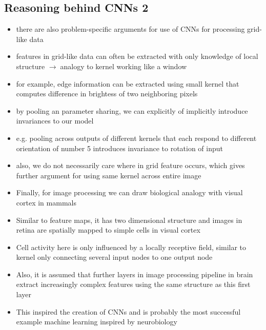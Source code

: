 \documentclass{article}
\newcommand{\arrow}{$\rightarrow\;$}
\begin{document}
\subsection*{Reasoning behind CNNs 2}
\begin{itemize}
    \item there are also problem-specific arguments for use of CNNs for processing grid-like data
    \item features in grid-like data can often be extracted with only knowledge of local structure \arrow analogy to kernel working like a window
    \item for example, edge information can be extracted using small kernel that computes difference in brightess of two neighboring pixels
    \item by pooling an parameter sharing, we can explicitly of implicitly introduce invariances to our model
    \item e.g. pooling across outputs of different kernels that each respond to different orientation of number 5 introduces invariance to rotation of input
    \item also, we do not necessarily care where in grid feature occurs, which gives further argument for using same kernel across entire image
    \item Finally, for image processing we can draw biological analogy with visual cortex in mammals
    \item Similar to feature maps, it has two dimensional structure and images in retina are spatially mapped to simple cells in visual cortex
    \item Cell activity here is only influenced by a locally receptive field, similar to kernel only connecting several input nodes to one output node
    \item Also, it is assumed that further layers in image processing pipeline in brain extract increasingly complex features using the same structure as this first layer
    \item This inspired the creation of CNNs and is probably the most successful example machine learning inspired by neurobiology
\end{itemize}
\end{document}
